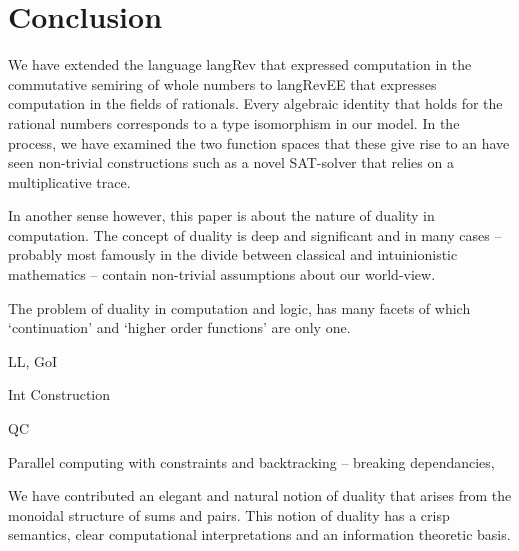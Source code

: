 \documentclass[preprint]{sigplanconf}
\begin{document}
\section{Conclusion}
\label{sec:conc}

We have extended the language {{langRev}} that expressed computation
in the commutative semiring of whole numbers to {{langRevEE}} that
expresses computation in the fields of rationals.  Every algebraic
identity that holds for the rational numbers corresponds to a type
isomorphism in our model.  In the process, we have examined the two
function spaces that these give rise to an have seen non-trivial
constructions such as a novel SAT-solver that relies on a
multiplicative trace.

In another sense however, this paper is about the nature of duality in
computation. The concept of duality is deep and significant and in
many cases -- probably most famously in the divide between classical
and intuinionistic mathematics -- contain non-trivial assumptions
about our world-view.

The problem of duality in computation and logic, has many facets of
which `continuation' and `higher order functions' are only one. 

LL, GoI

Int Construction

QC

Parallel computing with constraints and backtracking -- breaking
dependancies,



We have contributed an elegant and natural notion of duality that
arises from the monoidal structure of sums and pairs. This notion of
duality has a crisp semantics, clear computational interpretations and
an information theoretic basis. 
\end{document}
